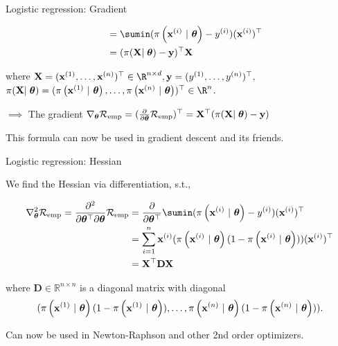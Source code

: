 \documentclass[11pt,compress,t,notes=noshow, xcolor=table]{beamer}
\begin{document}
\begin{frame}{Logistic regression: Gradient}

\begin{align*}
  \quad &= 
  \sumin (\pixit - \yi)(\xi)^\top\\
    \quad &= 
  (\pi(\mathbf{X}\vert\;\thetav) - \mathbf{y})^\top\mathbf{X}\\
\end{align*}

where  $\mathbf{X} = (
    \xi[1], \dots, 
    \xi[n])^\top \in \R^{n\times d}, \mathbf{y} = (
    \yi[1], \dots,
    \yi[n]
)^\top,$ \\ $\pi(\mathbf{X}\vert\;\thetav) = (
    \pixit[1], \dots,
    \pixit[n]
)^\top \in \R^{n}$.

\vfill

$\implies$ The gradient $\nabla_{\thetav}\riske = (\frac{\partial}{\partial\thetav}\riske)^\top =  \mathbf{X}^\top(\pi(\mathbf{X}\vert\;\thetav) - \mathbf{y})$ 

\vfill

This formula can now be used in gradient descent and its friends.

\end{frame}


\begin{frame}{Logistic regression: Hessian}

We find the Hessian via differentiation, s.t.,

{\small
\begin{align*}
  \nabla^2_{\thetav}\riske  = \frac{\partial^2}{\partial{\thetav^\top}\partial\thetav}\riske  & =  
 \frac{\partial}{\partial{\thetav^\top}} \sumin (\pixit - \yi)(\xi)^\top\\
 & =  
  \sum^n_{i=1}\xi (\pixit(1-\pixit))(\xi)^\top\\
  & =  
\mathbf{X}^\top \mathbf{D} \mathbf{X}\\
\end{align*}

where $\mathbf{D} \in \mathbb{R}^{n\times n}$ is a diagonal matrix with diagonal 
$$(\pixit[1](1-\pixit[1]), \dots, \pixit[n](1-\pixit[n])).$$
}

Can now be used in Newton-Raphson and other 2nd order optimizers.


\end{frame}
\end{document}
